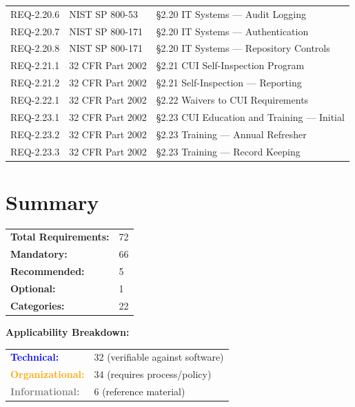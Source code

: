 \documentclass[11pt,letterpaper]{article}
\begin{document}
\begin{longtable}{@{}l l p{8cm}@{}}
REQ-2.20.6 & NIST SP 800-53 & \S2.20 IT Systems --- Audit Logging \\
REQ-2.20.7 & NIST SP 800-171 & \S2.20 IT Systems --- Authentication \\
REQ-2.20.8 & NIST SP 800-171 & \S2.20 IT Systems --- Repository Controls \\
REQ-2.21.1 & 32 CFR Part 2002 & \S2.21 CUI Self-Inspection Program \\
REQ-2.21.2 & 32 CFR Part 2002 & \S2.21 Self-Inspection --- Reporting \\
REQ-2.22.1 & 32 CFR Part 2002 & \S2.22 Waivers to CUI Requirements \\
REQ-2.23.1 & 32 CFR Part 2002 & \S2.23 CUI Education and Training --- Initial \\
REQ-2.23.2 & 32 CFR Part 2002 & \S2.23 Training --- Annual Refresher \\
REQ-2.23.3 & 32 CFR Part 2002 & \S2.23 Training --- Record Keeping \\
\bottomrule
\end{longtable}

\section{Summary}

\begin{tabular}{@{}ll@{}}
\textbf{Total Requirements:} & 72 \\
\textbf{Mandatory:} & 66 \\
\textbf{Recommended:} & 5 \\
\textbf{Optional:} & 1 \\
\textbf{Categories:} & 22 \\
\end{tabular}

\vspace{12pt}
\textbf{Applicability Breakdown:}

\begin{tabular}{@{}ll@{}}
\textcolor{blue}{\textbf{Technical:}} & 32 (verifiable against software) \\
\textcolor{orange}{\textbf{Organizational:}} & 34 (requires process/policy) \\
\textcolor{gray}{\textbf{Informational:}} & 6 (reference material) \\
\end{tabular}
\end{document}
